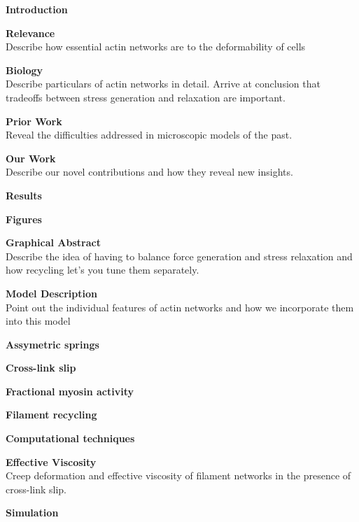 \documentclass{report}
\begin{document}
\begin{outline}
  \item {\bf Introduction }
  \begin{outline}
    \item {\bf Relevance } \\
      Describe how essential actin networks are to the deformability of cells
    \item {\bf Biology } \\
      Describe particulars of actin networks in detail.  Arrive at conclusion that tradeoffs between stress generation and relaxation are important.
    \item {\bf Prior Work } \\
      Reveal the difficulties addressed in microscopic models of the past. 
    \item {\bf Our Work } \\
      Describe our novel contributions and how they reveal new insights.
  \end{outline}
  \item {\bf Results}
  \begin{outline}
    \item {\bf Figures } 
      \begin{outline}
      \item {\bf Graphical Abstract } \\
	Describe the idea of having to balance force generation and stress relaxation and how recycling let's you tune them separately.
      \item {\bf Model Description } \\
	Point out the individual features of actin networks and how we incorporate them into this model
      \begin{outline}
	\item {\bf Assymetric springs } 
	\item {\bf Cross-link slip } 
	\item {\bf Fractional myosin activity } 
	\item {\bf Filament recycling } 
	\item {\bf Computational techniques } 
      \end{outline}
      \item {\bf Effective Viscosity } \\
	Creep deformation and effective viscosity of filament networks in the presence of cross-link slip.
      \begin{outline}
	\item {\bf Simulation } \\

\end{outline}
\end{outline}
\end{outline}
\end{outline}
\end{document}
